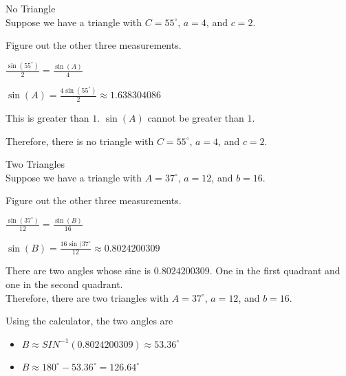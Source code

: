 \documentclass{ximera}
\begin{document}
\begin{example}  No Triangle \\

Suppose we have a triangle with $C=55^{\circ}$, $a=4$, and $c=2$.

Figure out the other three measurements.


\begin{explanation}


$\frac{\sin(55^{\circ})}{2} = \frac{\sin(A)}{4}$

$\sin(A) = \frac{4 \sin(55^{\circ})}{2} \approx 1.638304086$

This is greater than $1$. $\sin(A)$ cannot be greater than $1$.

Therefore, there is no triangle with $C=55^{\circ}$, $a=4$, and $c=2$. 

\end{explanation}


\end{example}












\begin{example}  Two Triangles \\

Suppose we have a triangle with $A=37^{\circ}$, $a=12$, and $b=16$.

Figure out the other three measurements.


\begin{explanation}


$\frac{\sin(37^{\circ})}{12} = \frac{\sin(B)}{16}$

$\sin(B) = \frac{16 \sin(37^{\circ}}{12} \approx 0.8024200309$

There are two angles whose sine is $0.8024200309$. One in the first quadrant and one in the second quadrant. \\

Therefore, there are two triangles with $A=37^{\circ}$, $a=12$, and $b=16$. 

Using the calculator, the two angles are

\begin{itemize}
\item $B \approx SIN^{-1}(0.8024200309) \approx 53.36^{\circ}$
\item $B \approx 180^{\circ} - 53.36^{\circ} = 126.64^{\circ}$
\end{itemize}

\end{explanation}


\end{example}
\end{document}
